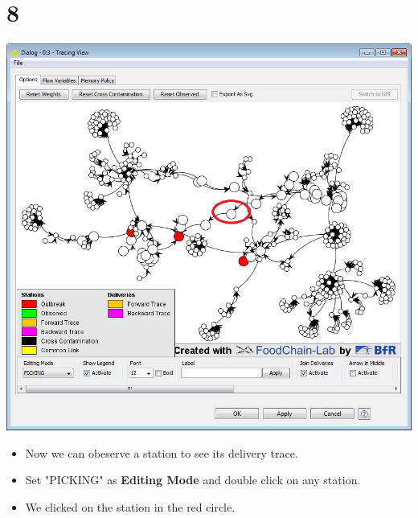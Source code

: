 \documentclass{beamer}
\begin{document}
\section{8}
\begin{frame}
	\begin{center}
  		\includegraphics[height=0.6\textheight]{8.png}
	\end{center}
	\begin{itemize}
		\item Now we can obeserve a station to see its delivery trace.
		\item Set "PICKING" as \textbf{Editing Mode} and double click on any station.
		\item We clicked on the station in the red circle.
	\end{itemize}
\end{frame}
\end{document}
